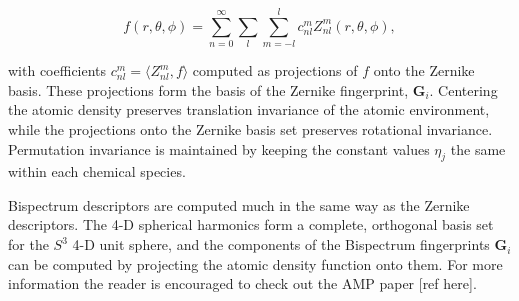 \begin{equation}
 f(r, \theta, \phi) = \sum_{n=0}^{\infty} \sum_l \sum_{m=-l}^l
    c_{nl}^m Z_{nl}^m (r, \theta, \phi) , 
\end{equation}


with coefficients $c_{nl}^m = \langle Z_{nl}^m, f \rangle$
computed as projections of $f$ onto the Zernike basis.
These projections form the basis of the Zernike fingerprint,
$\bm{G}_i$. Centering the atomic density preserves translation
invariance of the atomic environment, while the projections
onto the Zernike basis set preserves rotational invariance.
Permutation invariance is maintained by keeping the constant values
$\eta_j$ the same within each chemical species.
\par
Bispectrum descriptors are computed much in the same way
as the Zernike descriptors. The 4-D spherical harmonics
form a complete, orthogonal basis set for the $S^3$ 4-D unit
sphere, and the components of the Bispectrum fingerprints
$\bm{G}_i$ can be computed by projecting the atomic
density function onto them. For more information
the reader is encouraged to check out the AMP paper [ref here].
